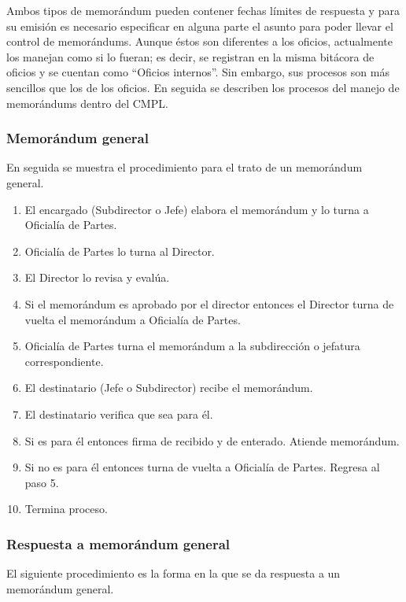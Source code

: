 	Ambos tipos de memorándum pueden contener fechas límites de respuesta y para su emisión es necesario especificar en alguna parte el asunto para poder llevar el control de memorándums. Aunque éstos son diferentes a los oficios, actualmente los manejan como si lo fueran; es decir, se registran en la misma bitácora de oficios y se cuentan como ``Oficios internos''. Sin embargo, sus procesos son más sencillos que los de los oficios. En seguida se describen los procesos del manejo de memorándums dentro del CMPL. 

	\subsubsection{Memorándum general}
	En seguida se muestra el procedimiento para el trato de un memorándum general.
	
	\begin{enumerate}
		\item El encargado (Subdirector o Jefe) elabora el memorándum y lo turna a Oficialía de Partes.
		\item Oficialía de Partes lo turna al Director.
		\item El Director lo revisa y evalúa.
		\item Si el memorándum es aprobado por el director entonces el Director turna de vuelta el memorándum a Oficialía de Partes.
		\item Oficialía de Partes turna el memorándum a la subdirección o jefatura correspondiente.
		\item El destinatario (Jefe o Subdirector) recibe el memorándum.
		\item El destinatario verifica que sea para él.
		\item Si es para él entonces firma de recibido y de enterado. Atiende memorándum.
		\item Si no es para él entonces turna de vuelta a Oficialía de Partes. Regresa al paso 5.
		\item Termina proceso.
	\end{enumerate}
	
	
	\subsubsection{Respuesta a memorándum general}
	El siguiente procedimiento es la forma en la que se da respuesta a un memorándum general.
	
